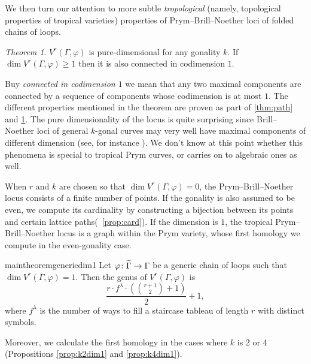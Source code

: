 \documentclass[11pt,reqno]{amsart}
\newcommand*{\maps}{\nobreak\mskip2mu\mathpunct{}\nonscript
  \mkern-\thinmuskip{:}\mskip6muplus1mu\relax}
\newcommand*{\wti}[1]{\widetilde{#1}}
\theoremstyle{definition}
\theoremstyle{problem}
\theoremstyle{plain}
\theoremstyle{remark}
\theoremstyle{theorem}
\newtheorem{maintheorem}{Theorem}
\numberwithin{equation}{section}
\numberwithin{figure}{section}
\begin{document}




We then turn our attention to more subtle \emph{tropological} (namely, topological properties of tropical varieties)
properties of Prym--Brill--Noether loci of folded chains of loops. 
\begin{maintheorem}\label{thm:pure-dim}
	$V^r(\Gamma,\varphi)$ is pure-dimensional for any gonality $k$. If $\dim V^r(\Gamma,\varphi)\geq 1$ then it is also connected in codimension $1$.
\end{maintheorem}
Buy \emph{connected in codimension $1$} we mean that any two maximal components are connected by a sequence of components whose codimension is at most $1$.
The different properties mentioned in the theorem are proven as part of  \cref{thm:path} and  \cref{thm:pure-dim}.
 The pure dimensionality of the locus is quite surprising since Brill--Noether loci of general $k$-gonal curves may very well  have maximal components of different dimension  (see, for instance \cite[Example 2.4]{Cook_Jensen_BN_Components}).  We don't know at this point whether this phenomena is special to tropical Prym curves, or carries on to algebraic ones as well. 



When $r$ and $k$ are
chosen so that $\dim V^r(\Gamma,\varphi)=0$, the Prym--Brill--Noether locus consists of a
finite number of points.  If the gonality is also assumed to be
even, we compute its cardinality by constructing a bijection between  its points and certain lattice paths(~\cref{prop:card}).  
 If
the dimension is $1$, the tropical Prym--Brill--Noether locus is a
graph within the Prym variety, whose first homology we compute in the even-gonality case. 
\begin{restatable}{maintheorem}{genericdim1}
  \label{genericdim1}
Let $\varphi\maps\wti\Gamma\to\Gamma$ be a generic chain of loops such that $\dim V^r(\Gamma,\varphi)=1$. Then the genus of 
$V^r(\Gamma,\varphi)$ is
  \begin{equation}
    \frac{r \cdot f^{\lambda}\cdot (\binom{r+1}{2}+1)}{2} + 1,
  \end{equation}
  where $f^\lambda$ is the number of ways to fill a staircase tableau of length $r$ with distinct symbols. 
\end{restatable}
\noindent Moreover, we calculate the first homology in the cases where
$k$ is 2 or 4 (Propositions \ref{prop:k2dim1} and \ref{prop:k4dim1}).  
\end{document}
